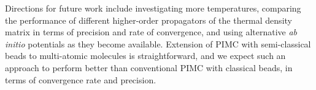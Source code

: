 Directions for future work include investigating more temperatures, comparing the performance of different higher-order propagators of the thermal density matrix in terms of precision and rate of convergence, and using alternative \emph{ab initio} potentials as they become available.
Extension of PIMC with semi-classical beads to multi-atomic molecules is straightforward, and we expect such an approach to perform better than conventional PIMC with classical beads, in terms of convergence rate and precision.
